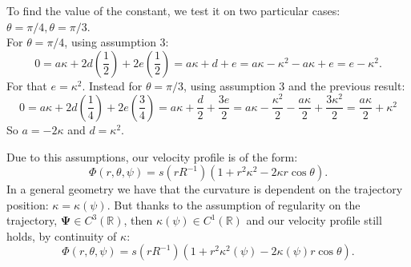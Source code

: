 \documentclass[a4paper]{report}
\begin{document}
\begin{enumerate}
\begin{equation*}
\end{equation*}
To find the value of the constant, we test it on two particular cases: $\theta= \pi/4, \theta= \pi/3$.\\
For $\theta=\pi/4$, using assumption 3:
\begin{equation*}
0=a \kappa + 2d (\frac{1}{2})+ 2 e(\frac{1}{2})= a\kappa + d+ e = a\kappa -\kappa^2 -a\kappa + e=e-\kappa^2 .
\end{equation*}
For that $e=\kappa^2$.
Instead for $	\theta= \pi/3$, using assumption 3 and the previous result:
\begin{equation*}
0= a \kappa + 2 d(\frac{1}{4})+ 2 e(\frac{3}{4})= a\kappa + \frac{d}{2}+ \frac{3e}{2}= a\kappa-\frac{ \kappa^2}{2}-\frac{a\kappa}{2}+\frac{3 \kappa^2}{2}= \frac{a\kappa}{2}+\kappa^2
\end{equation*}
So $a= -2\kappa$ and $d=\kappa^2$.
	\end{enumerate}

Due to this assumptions, our velocity profile is of the form:
\begin{equation}
\Phi(r,\theta,\psi) = s(r R^{-1})(1+r^2 \kappa^2- 2\kappa r \cos \theta).
\end{equation}
In a general geometry we have that the curvature is dependent on the trajectory position: $\kappa= \kappa (\psi)$.
But thanks to the assumption of regularity on the trajectory, $\boldsymbol{\Psi} \in C^3(\mathbb{R})$, then $\kappa(\psi) \in C^1(\mathbb{R})$ and our velocity profile still holds, by continuity of $\kappa$:
\begin{equation}
\Phi(r,\theta,\psi) = s(r R^{-1})(1+r^2 \kappa^2(\psi)- 2\kappa(\psi) r \cos \theta).
\end{equation}
\end{document}
